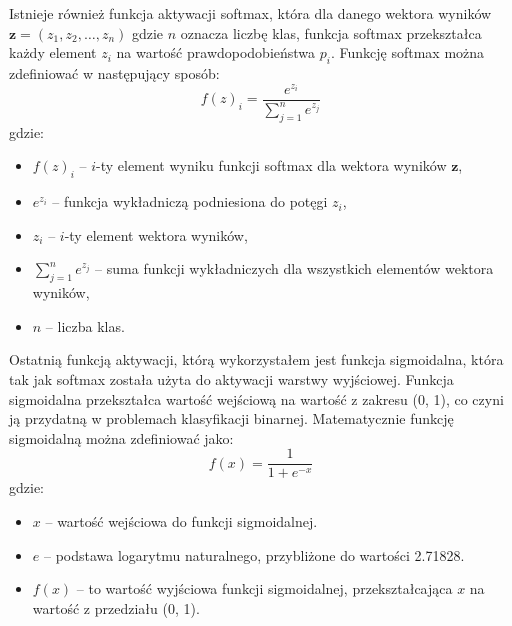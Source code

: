 \documentclass{article}
\begin{document}
Istnieje również funkcja aktywacji softmax, która dla danego wektora wyników \( \mathbf{z} = (z_1, z_2, \ldots, z_n) \) gdzie \( n \) oznacza liczbę klas, funkcja softmax przekształca każdy element \( z_i \) na wartość prawdopodobieństwa \( p_i \).
Funkcję softmax można zdefiniować w następujący sposób:
\[
    f(z)_i = \frac{e^{z_i}}{\sum_{j=1}^{n} e^{z_j}}
\]
gdzie:
\begin{itemize}
    \item \(f(z)_i\) -- \(i\)-ty element wyniku funkcji softmax dla wektora wyników \(\mathbf{z}\),
    \item \(e^{z_i}\) -- funkcja wykładniczą podniesiona do potęgi \(z_i\),
    \item \(z_i\) -- \(i\)-ty element wektora wyników,
    \item \(\sum_{j=1}^{n} e^{z_j}\) -- suma funkcji wykładniczych dla wszystkich elementów wektora wyników,
    \item \(n\) -- liczba klas.
\end{itemize}
Ostatnią funkcją aktywacji, którą wykorzystałem jest funkcja sigmoidalna, która tak jak softmax została użyta do aktywacji warstwy wyjściowej.
Funkcja sigmoidalna przekształca wartość wejściową na wartość z zakresu (0, 1), co czyni ją przydatną w problemach klasyfikacji binarnej.
Matematycznie funkcję sigmoidalną można zdefiniować jako:
\[
    f(x) = \frac{1}{1 + e^{-x}}
\]
gdzie:
\begin{itemize}
    \item \(x\) -- wartość wejściowa do funkcji sigmoidalnej.
    \item \(e\) --  podstawa logarytmu naturalnego, przybliżone do wartości 2.71828.
    \item \(f(x)\) -- to wartość wyjściowa funkcji sigmoidalnej, przekształcająca \(x\) na wartość z przedziału (0, 1).
\end{itemize}
\end{document}
